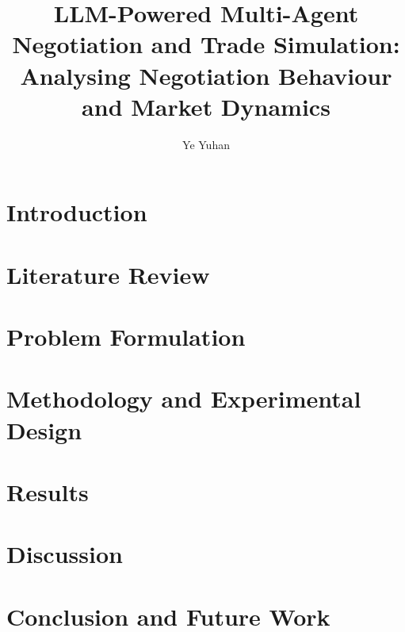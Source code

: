 \documentclass{article}
\title{LLM-Powered Multi-Agent Negotiation and Trade Simulation: Analysing Negotiation Behaviour and Market Dynamics}
\author{Ye Yuhan}
\begin{document}
\maketitle



\section{Introduction}


\section{Literature Review}


\section{Problem Formulation}


\section{Methodology and Experimental Design}


\section{Results}


\section{Discussion}


\section{Conclusion and Future Work}




\end{document}

